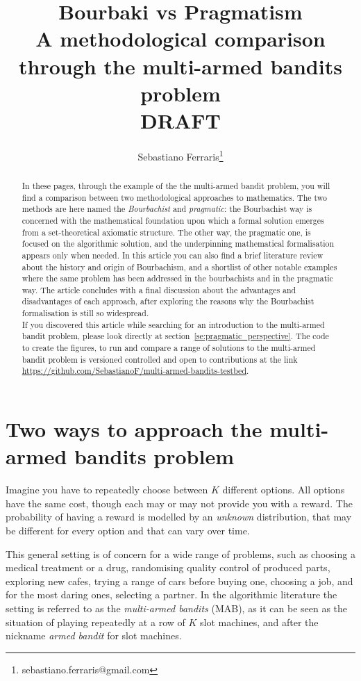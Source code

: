 \documentclass[]{scrartcl}
\title{Bourbaki vs Pragmatism \\ A methodological comparison through the multi-armed bandits problem 
 \\
 DRAFT
}
\author{Sebastiano Ferraris\footnote{sebastiano.ferraris@gmail.com}}
\theoremstyle{definition}
\begin{document}
\maketitle

\begin{abstract}
    In these pages, through the example of the the multi-armed bandit problem, you will find a comparison between two methodological approaches to mathematics.
    The two methods are here named the \emph{Bourbachist} and \emph{pragmatic}: the Bourbachist way is concerned with the mathematical foundation upon which a formal solution emerges from a set-theoretical axiomatic structure. The other way, the pragmatic one, is focused on the algorithmic solution, and the underpinning mathematical formalisation appears only when needed.
    In this article you can also find a brief literature review about the history and origin of Bourbachism,  and a shortlist of other notable examples where the same problem has been addressed in the bourbachists and in the pragmatic way. The article concludes with a final discussion about the advantages and disadvantages of each approach, after exploring the reasons why the Bourbachist formalisation is still so widespread. \\

\noindent
If you discovered this article while searching for an introduction to the multi-armed bandit problem, please look directly at section~\ref{se:pragmatic_perspective}. The code to create the figures, to run and compare a range of solutions to the multi-armed bandit problem is versioned controlled and open to contributions at the link \href{https://github.com/SebastianoF/multi-armed-bandits-testbed}{https://github.com/SebastianoF/multi-armed-bandits-testbed}.
\end{abstract}


\section{Two ways to approach the multi-armed bandits problem}
\label{se:intro}
Imagine you have to repeatedly choose between $K$ different options. All options have the same cost, though each may or may not provide you with a reward. The probability of having a reward is modelled by an \emph{unknown} distribution, that may be different for every option and that can vary over time.

This general setting is of concern for a wide range of problems, such as choosing a medical treatment or a drug, randomising quality control of produced parts, exploring new cafes, trying a range of cars before buying one, choosing a job, and for the most daring ones, selecting a partner. In the algorithmic literature the setting is referred to as the \emph{multi-armed bandits} (MAB), as it can be seen as the situation of playing repeatedly at a row of $K$ slot machines, and after the nickname \emph{armed bandit} for slot machines. 
\end{document}
